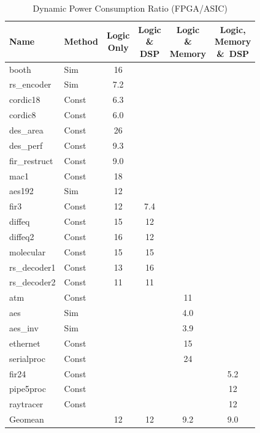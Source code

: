 \begin{table}[htbp]
\centering
\caption{Dynamic Power Consumption Ratio (FPGA/ASIC)}
\label{tab:power-ratio}
\begin{tabular}{llcccc}
\toprule
Name & Method & \shortstack{Logic\\Only} & \shortstack{Logic\\\&\\DSP} & \shortstack{Logic\\\&\\Memory} & \shortstack{Logic,\\Memory\\\&\ DSP} \\
\midrule
booth        & Sim   & 16   &     &     &     \\
rs\_encoder  & Sim   & 7.2  &     &     &     \\
cordic18     & Const & 6.3  &     &     &     \\
cordic8      & Const & 6.0  &     &     &     \\
des\_area    & Const & 26   &     &     &     \\
des\_perf    & Const & 9.3  &     &     &     \\
fir\_restruct& Const & 9.0  &     &     &     \\
mac1         & Const & 18   &     &     &     \\
aes192       & Sim   & 12   &     &     &     \\
fir3         & Const & 12   & 7.4 &     &     \\
diffeq       & Const & 15   & 12  &     &     \\
diffeq2      & Const & 16   & 12  &     &     \\
molecular    & Const & 15   & 15  &     &     \\
rs\_decoder1 & Const & 13   & 16  &     &     \\
rs\_decoder2 & Const & 11   & 11  &     &     \\
atm          & Const &      &     & 11  &     \\
aes          & Sim   &      &     & 4.0 &     \\
aes\_inv     & Sim   &      &     & 3.9 &     \\
ethernet     & Const &      &     & 15  &     \\
serialproc   & Const &      &     & 24  &     \\
fir24        & Const &      &     &     & 5.2 \\
pipe5proc    & Const &      &     &     & 12  \\
raytracer    & Const &      &     &     & 12  \\
\midrule
Geomean      &       & 12   & 12  & 9.2 & 9.0 \\
\bottomrule
\end{tabular}
\end{table}

